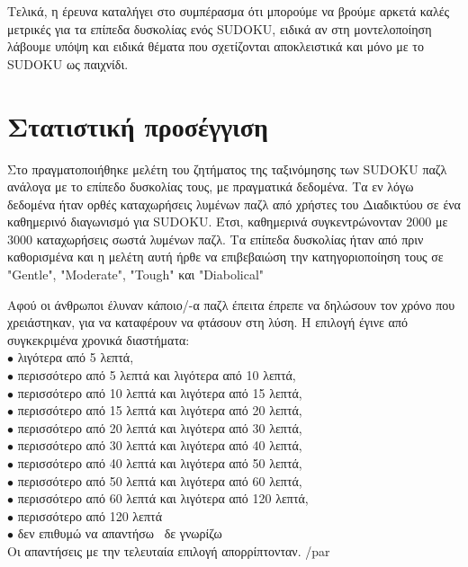 \documentclass[12pt]{book}
\theoremstyle{definition}
\begin{document}
Τελικά, η έρευνα \cite{5} καταλήγει στο συμπέρασμα ότι μπορούμε να βρούμε αρκετά καλές μετρικές για τα επίπεδα δυσκολίας ενός SUDOKU, ειδικά αν στη μοντελοποίηση λάβουμε υπόψη και ειδικά θέματα που σχετίζονται αποκλειστικά και μόνο με το SUDOKU ως παιχνίδι. 

\section{Στατιστική προσέγγιση}

Στο \cite{9} πραγματοποιήθηκε μελέτη του ζητήματος της ταξινόμησης των SUDOKU παζλ ανάλογα με το επίπεδο δυσκολίας τους, με πραγματικά δεδομένα. Τα εν λόγω δεδομένα ήταν ορθές καταχωρήσεις λυμένων παζλ από χρήστες του Διαδικτύου σε ένα καθημερινό διαγωνισμό για SUDOKU. Έτσι, καθημερινά συγκεντρώνονταν 2000 με 3000 καταχωρήσεις σωστά λυμένων παζλ. Τα επίπεδα δυσκολίας ήταν από πριν καθορισμένα και η μελέτη αυτή ήρθε να επιβεβαιώση την κατηγοριοποίηση τους σε "Gentle", "Moderate", "Tough" και "Diabolical" \par

Αφού οι άνθρωποι έλυναν κάποιο/-α παζλ έπειτα έπρεπε να δηλώσουν τον χρόνο που χρειάστηκαν, για να καταφέρουν να φτάσουν στη λύση. Η επιλογή έγινε από συγκεκριμένα χρονικά διαστήματα: \\
\(\bullet\) λιγότερα από 5 λεπτά, \\
\(\bullet\) περισσότερο από 5 λεπτά και λιγότερα από 10 λεπτά, \\
\(\bullet\) περισσότερο από 10 λεπτά και λιγότερα από 15 λεπτά, \\
\(\bullet\) περισσότερο από 15 λεπτά και λιγότερα από 20 λεπτά, \\
\(\bullet\) περισσότερο από 20 λεπτά και λιγότερα από 30 λεπτά, \\
\(\bullet\) περισσότερο από 30 λεπτά και λιγότερα από 40 λεπτά, \\
\(\bullet\) περισσότερο από 40 λεπτά και λιγότερα από 50 λεπτά, \\
\(\bullet\) περισσότερο από 50 λεπτά και λιγότερα από 60 λεπτά, \\
\(\bullet\) περισσότερο από 60 λεπτά και λιγότερα από 120 λεπτά, \\
\(\bullet\) περισσότερο από 120 λεπτά \\
\(\bullet\) δεν επιθυμώ να απαντήσω \ δε γνωρίζω \\

Οι απαντήσεις με την τελευταία επιλογή απορρίπτονταν.  /par
\end{document}
